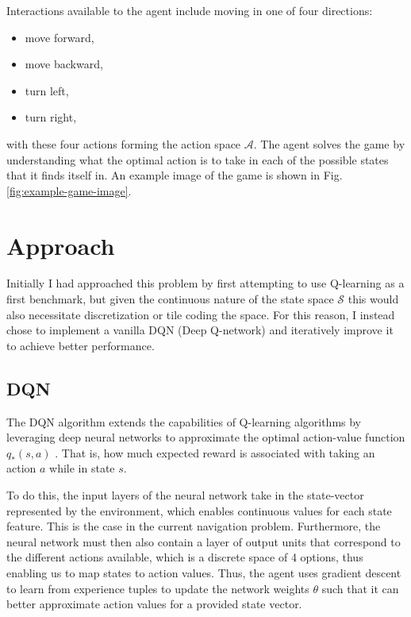 \documentclass[11pt]{article}
\begin{document}
\FloatBarrier

Interactions available to the agent include moving in one of four directions:
\begin{itemize}
	\item move forward,
	\item move backward,
	\item turn left,
	\item turn right,
\end{itemize}
with these four actions forming the action space $\mathcal{A}$. The agent solves the game by understanding what the optimal action is to take in each of the possible states that it finds itself in. An example image of the game is shown in Fig. \ref{fig:example-game-image}.


\section{Approach}

Initially I had approached this problem by first attempting to use Q-learning as
a first benchmark, but given the continuous nature of the state space
$\mathcal{S}$ this would also necessitate discretization or tile coding the
space. For this reason, I instead chose to implement a vanilla DQN (Deep
Q-network) and iteratively improve it to achieve better performance.

\subsection{DQN}

The DQN algorithm extends the capabilities of Q-learning algorithms by leveraging deep neural networks to approximate the optimal action-value function $q_*(s, a)$ \cite{dqn}. That is, how much expected reward is associated with taking an action $a$ while in state $s$. 

To do this, the input layers of the neural network take in the state-vector represented by the environment, which enables continuous values for each state feature. This is the case in the current navigation problem. Furthermore, the neural network must then also contain a layer of output units that correspond to the different actions available, which is a discrete space of 4 options, thus enabling us to map states to action values. Thus, the agent uses gradient descent to learn from experience tuples to update the network weights $\theta$ such that it can better approximate action values for a provided state vector.
\end{document}
